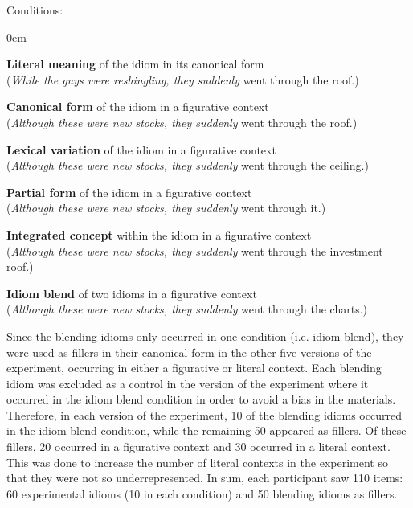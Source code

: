 \documentclass[output=paper
,modfonts
,nonflat]{langsci/langscibook}
\begin{document}
{\sc Conditions:}
\begin{enumerate}
\small{
\itemsep0em
\item 	{\bf Literal meaning} of the idiom in its canonical form\\
	(\textit{While the guys were reshingling, they suddenly} went through the roof.)
\item 	{\bf Canonical form} of the idiom in a figurative context\\
	(\textit{Although these were new stocks, they suddenly} went through the roof.)
\item	{\bf Lexical variation} of the idiom in a figurative context\\
	(\textit{Although these were new stocks, they suddenly} went through the ceiling.)
\item	{\bf Partial form} of the idiom in a figurative context\\
	(\textit{Although these were new stocks, they suddenly} went through it.)
\item	{\bf Integrated concept} within the idiom in a figurative context\\
	(\textit{Although these were new stocks, they suddenly} went through the investment roof.)
\item	{\bf Idiom blend} of two idioms in a figurative context\\
	(\textit{Although these were new stocks, they suddenly} went through the charts.)
	}
\end{enumerate}


Since the blending idioms only occurred in one condition (i.e. idiom blend), they were used as fillers in their canonical form in the other five versions of the experiment, occurring in either a figurative or literal context. Each blending idiom was excluded as a control in the version of the experiment where it occurred in the idiom blend condition in order to avoid a bias in the materials. Therefore, in each version of the experiment, 10 of the blending idioms occurred in the idiom blend condition, while the remaining 50 appeared as fillers. Of these fillers, 20 occurred in a figurative context and 30 occurred in a literal context. This was done to increase the number of literal contexts in the experiment so that they were not so underrepresented. In sum, each participant saw 110 items: 60 experimental idioms (10 in each condition) and 50 blending idioms as fillers.
\end{document}
